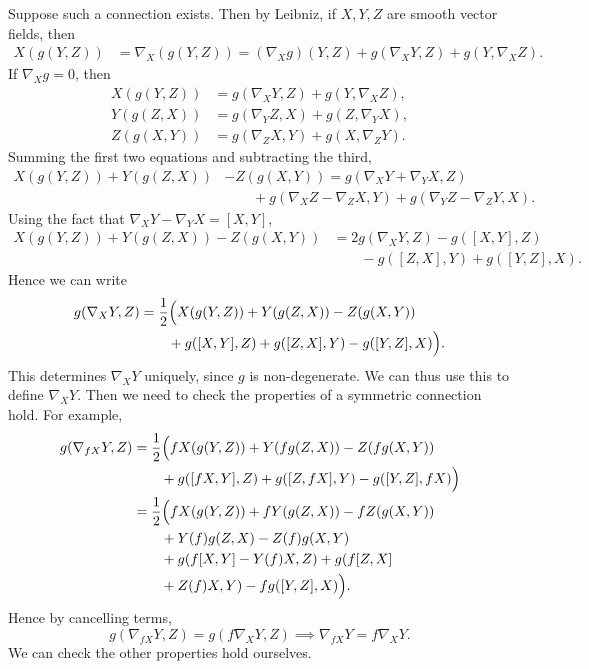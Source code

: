 \documentclass[12pt]{article}
\begin{document}
\begin{proofbox}
	Suppose such a connection exists. Then by Leibniz, if $X, Y, Z$ are smooth vector fields, then
	\begin{align*}
		X(g(Y,Z)) &= \nabla_X (g(Y, Z)) = (\nabla_X g)(Y, Z) + g(\nabla_X Y, Z) + g(Y, \nabla_X Z).
	\end{align*}
	If $\nabla_X g = 0$, then
	\begin{align*}
		X(g(Y,Z)) &= g(\nabla_X Y, Z) + g(Y, \nabla_X Z), \\
		Y(g(Z,X)) &= g(\nabla_Y Z, X) + g(Z, \nabla_Y X), \\
		Z(g(X,Y)) &= g(\nabla_Z X, Y) + g(X, \nabla_Z Y).
	\end{align*}
	Summing the first two equations and subtracting the third,
	\begin{align*}
		X(g(Y,Z)) + Y(g(Z,X)) &- Z(g(X,Y)) = g(\nabla_X Y + \nabla_Y X, Z) \\
						  &\qquad + g(\nabla_X Z - \nabla_ZX,Y) + g(\nabla_YZ - \nabla_ZY, X).
	\end{align*}
	Using the fact that $\nabla_XY - \nabla_YX = [X, Y]$,
	\begin{align*}
		X(g(Y,Z)) + Y(g(Z,X)) - Z(g(X,Y)) &= 2 g(\nabla_XY, Z) - g([X, Y], Z) \\
						  & \qquad - g([Z, X], Y) + g([Y, Z], X).
	\end{align*}
	Hence we can write
	\begin{align*}
		g(\nabla_XY, Z) &= \frac{1}{2} \Bigl( X(g(Y, Z)) + Y(g(Z,X)) - Z(g(X,Y)) \\
				& \qquad + g([X, Y], Z) + g([Z,X],Y) - g([Y,Z],X) \Bigr).
	\end{align*}
	This determines $\nabla_X Y$ uniquely, since $g$ is non-degenerate. We can thus use this to define $\nabla_X Y$. Then we need to check the properties of a symmetric connection hold. For example,
	\begin{align*}
		g(\nabla_{fX}Y,Z)&= \frac{1}{2} \Bigl( f X(g(Y,Z)) + Y(fg(Z,X)) - Z(fg(X,Y)) \\
				 & \qquad + g([fX,Y],Z) + g([Z,fX], Y) - g([Y,Z],fX) \Bigr) \\
				 &= \frac{1}{2} \Bigl( fX(g(Y,Z)) + fY(g(Z,X)) - fZ(g(X,Y)) \\
				 &\qquad + Y(f) g(Z,X) - Z(f) g(X,Y) \\
				 & \qquad + g(f[X,Y] - Y(f)X, Z) + g(f[Z,X] \\
				 & \qquad + Z(f)X, Y) - fg([Y, Z], X) \Bigr).
	\end{align*}
	Hence by cancelling terms,
	\[
	g(\nabla_{fX}Y, Z) = g(f\nabla_XY,Z) \implies \nabla_{fX}Y = f\nabla_XY.
	\]
	We can check the other properties hold ourselves.
\end{proofbox}
\end{document}

